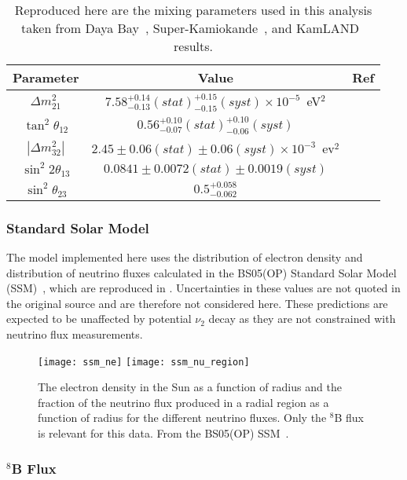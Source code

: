 \begin{table}
\centering
\begin{tabular}{c|c|c}
Parameter & Value & Ref \\ \hline
$ \Delta m ^2 _{21} $ & $7.58^{+0.14}_{-0.13}(stat)^{+0.15}_{-0.15}(syst) \times 10^{-5}$~eV$^2$ & \cite{kamland} \\ \hline
$ \tan^2 \theta_{12} $ & $0.56^{+0.10}_{-0.07}(stat)^{+0.10}_{-0.06}(syst) $ & \cite{kamland} \\ \hline
$ |\Delta m ^2 _{32}| $ & $2.45\pm0.06(stat)\pm0.06(syst) \times 10^{-3}$~ev$^2$ & \cite{dayabay} \\ \hline
$ \sin^2 2\theta_{13} $ & $0.0841\pm0.0072(stat)\pm0.0019(syst)$ & \cite{dayabay} \\ \hline
$ \sin^2 \theta_{23} $ & $0.5^{+0.058}_{-0.062}$ & \cite{superkth23} \\ 
\end{tabular}
\caption{
\label{tbl:mixing_params}
Reproduced here are the mixing parameters used in this analysis taken from Daya Bay~\cite{dayabay}, Super-Kamiokande~\cite{superkth23}, and KamLAND~\cite{kamland} results.
}
\end{table}

\subsubsection{Standard Solar Model}

The model implemented here uses the distribution of electron density and distribution of neutrino fluxes calculated in the BS05(OP) Standard Solar Model (SSM)~\cite{bs05op}, which are reproduced in . 
Uncertainties in these values are not quoted in the original source and are therefore not considered here.
These predictions are expected to be unaffected by potential $\nu_2$ decay as they are not constrained with neutrino flux measurements.

\begin{figure}
\centering
\texttt{[image: ssm\_ne]}
\texttt{[image: ssm\_nu\_region]}
\caption{
The electron density in the Sun as a function of radius and the fraction of the neutrino flux produced in a radial region as a function of radius for the different neutrino fluxes. Only the $^8$B flux is relevant for this data. From the BS05(OP) SSM~\cite{bs05op}.
}
\label{fig:ssm}
\end{figure}

\subsubsection{$^8$B Flux}

